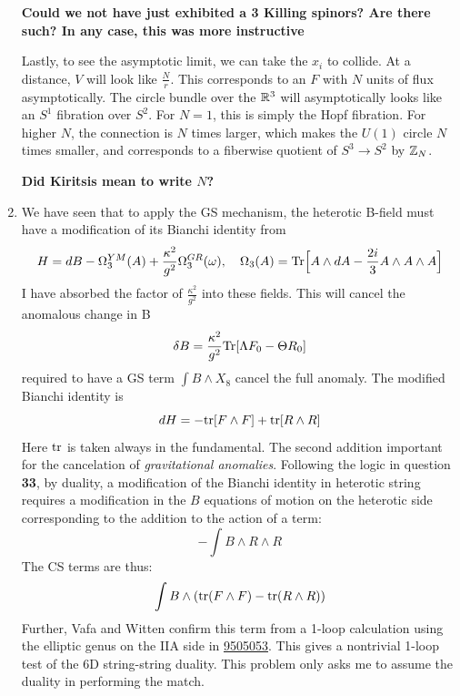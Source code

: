\documentclass[11pt, class=article, crop=false]{standalone}
\begin{document}
\begin{enumerate}
	\textbf{Could we not have just exhibited a 3 Killing spinors? Are there such? In any case, this was more instructive}
	
	Lastly, to see the asymptotic limit, we can take the $x_i$ to collide. At a distance, $V$ will look like $\frac{N}{r}$. This corresponds to an $F$ with $N$ units of flux asymptotically. The circle bundle over the $\mathbb{R}^3$ will asymptotically looks like an $S^1$ fibration over $S^2$. For $N = 1$, this is simply the Hopf fibration. For higher $N$, the connection is $N$ times larger, which makes the $U(1)$ circle $N$ times smaller, and corresponds to a fiberwise quotient of $S^3 \to S^2$ by $\mathbb{Z}_N$.
	
	\textbf{Did Kiritsis mean to write $N$?}
	

	\item We have seen that to apply the GS mechanism, the heterotic B-field must have a modification of its Bianchi identity from
	\[
		H = dB - \Omega_3^{YM}(A) + \frac{\kappa^2}{g^2} \Omega_3^{GR}(\omega), \quad \Omega_3(A) = \mathrm{Tr} \Big[A \wedge dA - \frac{2i}3 A \wedge A \wedge A\Big]
	\]
	I have absorbed the factor of $\frac{\kappa^2}{g^2}$ into these fields. This will cancel the anomalous change in B
	\[
		\delta B = \frac{\kappa^2}{g^2} \mathrm{Tr}[\Lambda F_0 - \Theta R_0]
	\]
	required to have a GS term $\int B \wedge X_8$ cancel the full anomaly. The modified Bianchi identity is
	\[
		dH = -\mathrm{tr}[F \wedge F] + \mathrm{tr}[R \wedge R]
	\]
	Here $\mathrm{tr}$ is taken always in the fundamental. The second addition important for the cancelation of \emph{gravitational anomalies}.
	Following the logic in question \textbf{33}, by duality, a modification of the Bianchi identity in heterotic string requires a modification in the $B$ equations of motion on the heterotic side corresponding to the addition to the action of a term:
	\[
		-\int B \wedge R \wedge R
	\]
	The CS terms are thus:
	\[
		\int B \wedge (\mathrm{tr}(F \wedge F) - \mathrm{tr}(R \wedge R))
	\]
	 Further, Vafa and Witten confirm this term from a 1-loop calculation using the elliptic genus on the IIA side in \href{https://arxiv.org/pdf/hep-th/9505053.pdf}{9505053}. This gives a nontrivial 1-loop test of the 6D string-string duality. This problem only asks me to assume the duality in performing the match.
	

\end{enumerate}
\end{document}
